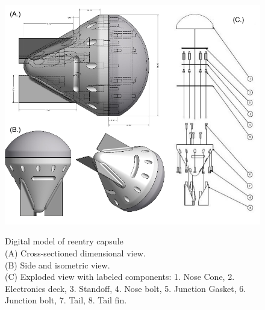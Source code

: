 \documentclass{article}
\begin{document}
\newpage
	\begin{figure}[H]
	\begin{center}
		\includegraphics[width=11.5cm]{CapsuleCAD}\\
	\end{center}
		\caption{}
		\label{capsule}
Digital model of reentry capsule\\ (A) Cross-sectioned dimensional view. \\(B) Side and isometric view. \\(C) Exploded view with labeled components: 1. Nose Cone, 2. Electronics deck, 3. Standoff, 4. Nose bolt, 5. Junction Gasket, 6. Junction bolt, 7. Tail, 8. Tail fin.
	\end{figure}
	
\end{document}
